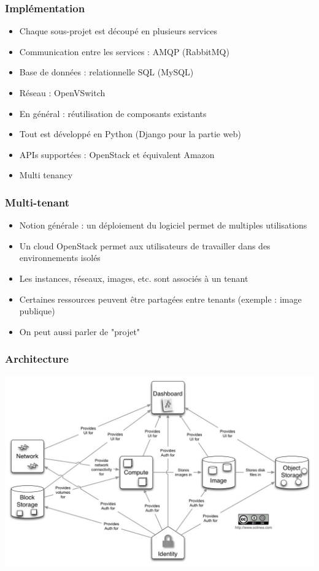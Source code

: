   \begin{frame}
    \frametitle{Implémentation}
    \begin{itemize}
      \item Chaque sous-projet est découpé en plusieurs services\pause
      \item Communication entre les services : AMQP (RabbitMQ)\pause
      \item Base de données : relationnelle SQL (MySQL)\pause
      \item Réseau : OpenVSwitch\pause
      \item En général : réutilisation de composants existants\pause
      \item Tout est développé en Python (Django pour la partie web)\pause
      \item APIs supportées : OpenStack et équivalent Amazon\pause
      \item Multi tenancy
    \end{itemize}
  \end{frame}

  \begin{frame}
    \frametitle{Multi-tenant}
    \begin{itemize}
      \item Notion générale : un déploiement du logiciel permet de multiples utilisations
      \item Un cloud OpenStack permet aux utilisateurs de travailler dans des environnements isolés
      \item Les instances, réseaux, images, etc. sont associés à un tenant
      \item Certaines ressources peuvent être partagées entre tenants (exemple : image publique)
      \item On peut aussi parler de "projet"
    \end{itemize}
  \end{frame}

  \begin{frame}
    \frametitle{Architecture}
    \begin{center}
      \includegraphics[width=\textwidth]{images/architecture-simple.jpg}
    \end{center}
  \end{frame}

